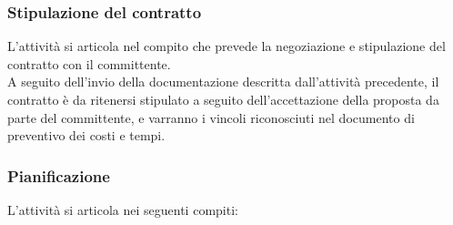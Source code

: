 \subsubsection{Stipulazione del contratto}
L'attività si articola nel compito che prevede la negoziazione e stipulazione del contratto con il committente.\\
A seguito dell'invio della documentazione descritta dall'attività precedente, il contratto è da ritenersi stipulato a seguito dell'accettazione della proposta da parte del committente, e varranno i vincoli riconosciuti nel documento di preventivo dei costi e tempi.

\subsubsection{Pianificazione}
L'attività si articola nei seguenti compiti:
